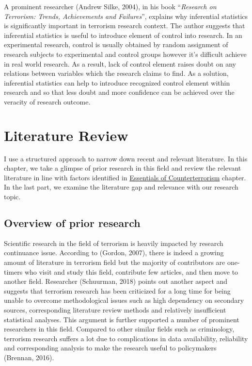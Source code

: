 \documentclass[11pt,oneside,a4paper]{reedthesis}
\begin{document}
A prominent researcher (Andrew Silke, 2004), in his book
``\emph{Research on Terrorism: Trends, Achievements and Failures}'',
explains why inferential statistics is significantly important in
terrorism research context. The author suggests that inferential
statistics is useful to introduce element of control into research. In
an experimental research, control is usually obtained by random
assignment of research subjects to experimental and control groups
however it's difficult achieve in real world research. As a result, lack
of control element raises doubt on any relations between variables which
the research claims to find. As a solution, inferential statistics can
help to introduce recognized control element within research and so that
less doubt and more confidence can be achieved over the veracity of
research outcome.

\hypertarget{literature-review}{\chapter{Literature
Review}\label{literature-review}}

I use a structured approach to narrow down recent and relevant
literature. In this chapter, we take a glimpse of prior research in this
field and review the relevant literature in line with factors identified
in \protect\hyperlink{essentials-counter}{Essentials of
Counterterrorism} chapter. In the last part, we examine the literature
gap and relevance with our research topic.

\section{Overview of prior research}\label{overview-of-prior-research}

Scientific research in the field of terrorism is heavily impacted by
research continuance issue. According to (Gordon, 2007), there is indeed
a growing amount of literature in terrorism field but the majority of
contributors are one-timers who visit and study this field, contribute
few articles, and then move to another field. Researcher (Schuurman,
2018) points out another aspect and suggests that terrorism research has
been criticized for a long time for being unable to overcome
methodological issues such as high dependency on secondary sources,
corresponding literature review methods and relatively insufficient
statistical analyses. This argument is further supported a number of
prominent researchers in this field. Compared to other similar fields
such as criminology, terrorism research suffers a lot due to
complications in data availability, reliability and corresponding
analysis to make the research useful to policymakers (Brennan, 2016).
\end{document}

